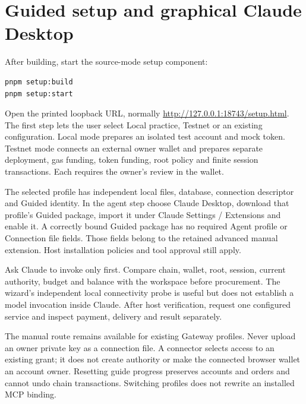 \section{Guided setup and graphical Claude Desktop}
After building, start the source-mode setup component:
\begin{lstlisting}
pnpm setup:build
pnpm setup:start
\end{lstlisting}
Open the printed loopback URL, normally \url{http://127.0.0.1:18743/setup.html}. The first step lets the user select Local practice, Testnet or an existing configuration. Local mode prepares an isolated test account and mock token. Testnet mode connects an external owner wallet and prepares separate deployment, gas funding, token funding, root policy and finite session transactions. Each requires the owner's review in the wallet.

The selected profile has independent local files, database, connection descriptor and Guided identity. In the agent step choose Claude Desktop, download that profile's Guided package, import it under Claude Settings / Extensions and enable it. A correctly bound Guided package has no required Agent profile or Connection file fields. Those fields belong to the retained advanced manual extension. Host installation policies and tool approval still apply.

Ask Claude to invoke only  first. Compare chain, wallet, root, session, current authority, budget and balance with the workspace before procurement. The wizard's independent local connectivity probe is useful but does not establish a model invocation inside Claude. After host verification, request one configured service and inspect payment, delivery and result separately.\citep{mcp}

The manual route remains available for existing Gateway profiles. Never upload an owner private key as a connection file. A connector selects access to an existing grant; it does not create authority or make the connected browser wallet an account owner. Resetting guide progress preserves accounts and orders and cannot undo chain transactions. Switching profiles does not rewrite an installed MCP binding.

